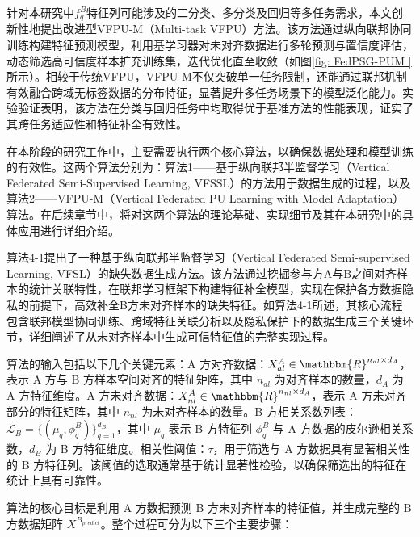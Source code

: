 针对本研究中$f_q^B$特征列可能涉及的二分类、多分类及回归等多任务需求，本文创新性地提出改进型VFPU-M（Multi-task VFPU）方法。该方法通过纵向联邦协同训练构建特征预测模型，利用基学习器对未对齐数据进行多轮预测与置信度评估，动态筛选高可信度样本扩充训练集，迭代优化直至收敛（如图\ref{fig: FedPSG-PUM }所示）。相较于传统VFPU，VFPU-M不仅突破单一任务限制，还能通过联邦机制有效融合跨域无标签数据的分布特征，显著提升多任务场景下的模型泛化能力。实验验证表明，该方法在分类与回归任务中均取得优于基准方法的性能表现，证实了其跨任务适应性和特征补全有效性。

在本阶段的研究工作中，主要需要执行两个核心算法，以确保数据处理和模型训练的有效性。这两个算法分别为：算法1——基于纵向联邦半监督学习（Vertical Federated Semi-Supervised Learning, VFSSL）的方法用于数据生成的过程，以及算法2——VFPU-M（Vertical Federated PU Learning with Model Adaptation）算法。在后续章节中，将对这两个算法的理论基础、实现细节及其在本研究中的具体应用进行详细介绍。

算法4-1提出了一种基于纵向联邦半监督学习（Vertical Federated Semi-supervised Learning, VFSL）的缺失数据生成方法。该方法通过挖掘参与方A与B之间对齐样本的统计关联特性，在联邦学习框架下构建特征补全模型，实现在保护各方数据隐私的前提下，高效补全B方未对齐样本的缺失特征。如算法4-1所述，其核心流程包含联邦模型协同训练、跨域特征关联分析以及隐私保护下的数据生成三个关键环节，详细阐述了从未对齐样本中生成可信特征值的完整实现过程。

算法的输入包括以下几个关键元素：A 方对齐数据：$X_{al}^A \in \mathbbm{R}^{n_{al} \times d_A}$，表示 A 方与 B 方样本空间对齐的特征矩阵，其中 $n_{al}$ 为对齐样本的数量，$d_A$ 为 A 方特征维度。A 方未对齐数据：$X_{nl}^A \in \mathbbm{R}^{n_{nl} \times d_A}$，表示 A 方未对齐部分的特征矩阵，其中 $n_{nl}$ 为未对齐样本的数量。B 方相关系数列表：$\mathcal{L}_B = \{(\mu_q, \phi^B_q)\}_{q=1}^{d_B}$，其中 $\mu_q$ 表示 B 方特征列 $\phi^B_q$ 与 A 方数据的皮尔逊相关系数，$d_B$ 为 B 方特征维度。相关性阈值：$\tau$，用于筛选与 A 方数据具有显著相关性的 B 方特征列。该阈值的选取通常基于统计显著性检验，以确保筛选出的特征在统计上具有可靠性。

算法的核心目标是利用 A 方数据预测 B 方未对齐样本的特征值，并生成完整的 B 方数据矩阵 $X^{B_{predict}}$。整个过程可分为以下三个主要步骤：


